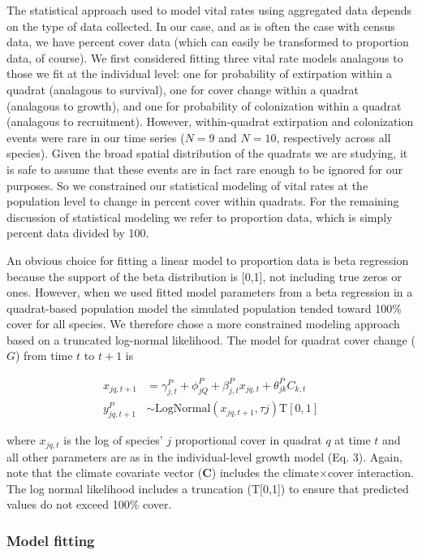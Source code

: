 \documentclass[12pt,]{article}
\begin{document}
The statistical approach used to model vital rates using aggregated data
depends on the type of data collected. In our case, and as is often the
case with census data, we have percent cover data (which can easily be
transformed to proportion data, of course). We first considered fitting
three vital rate models analagous to those we fit at the individual
level: one for probability of extirpation within a quadrat (analagous to
survival), one for cover change within a quadrat (analagous to growth),
and one for probability of colonization within a quadrat (analagous to
recruitment). However, within-quadrat extirpation and colonization
events were rare in our time series ($N=9$ and $N=10$, respectively
across all species). Given the broad spatial distribution of the
quadrats we are studying, it is safe to assume that these events are in
fact rare enough to be ignored for our purposes. So we constrained our
statistical modeling of vital rates at the population level to change in
percent cover within quadrats. For the remaining discussion of
statistical modeling we refer to proportion data, which is simply
percent data divided by 100.

An obvious choice for fitting a linear model to proportion data is beta
regression because the support of the beta distribution is {[}0,1{]},
not including true zeros or ones. However, when we used fitted model
parameters from a beta regression in a quadrat-based population model
the simulated population tended toward 100\% cover for all species. We
therefore chose a more constrained modeling approach based on a
truncated log-normal likelihood. The model for quadrat cover change
($G$) from time $t$ to $t+1$ is

\begin{align}
x_{jq,t+1} &= \gamma^{P}_{j,t} + \phi^{P}_{jQ} + \beta^{P}_{j,t}x_{jq,t} + \theta^{P}_{jk}C_{k,t} \\
y^{P}_{jq,t+1} &\sim \text{LogNormal}(x_{jq,t+1}, \tau{j}) \text{T}[0,1]
\end{align}

where $x_{jq,t}$ is the log of species' $j$ proportional cover in
quadrat $q$ at time $t$ and all other parameters are as in the
individual-level growth model (Eq. 3). Again, note that the climate
covariate vector (\textbf{C}) includes the climate$\times$cover
interaction. The log normal likelihood includes a truncation
(T{[}0,1{]}) to ensure that predicted values do not exceed 100\% cover.

\subsubsection{Model fitting}\label{model-fitting}
\end{document}
